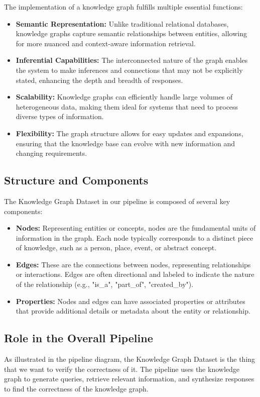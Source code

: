 The implementation of a knowledge graph fulfills multiple essential functions:
\begin{itemize}
    \item \textbf{Semantic Representation:} Unlike traditional relational databases, knowledge graphs capture semantic relationships between entities, allowing for more nuanced and context-aware information retrieval.
    \item \textbf{Inferential Capabilities:} The interconnected nature of the graph enables the system to make inferences and connections that may not be explicitly stated, enhancing the depth and breadth of responses.
    \item \textbf{Scalability:} Knowledge graphs can efficiently handle large volumes of heterogeneous data, making them ideal for systems that need to process diverse types of information.
    \item \textbf{Flexibility:} The graph structure allows for easy updates and expansions, ensuring that the knowledge base can evolve with new information and changing requirements.
\end{itemize}

\subsection{Structure and Components}\label{subsec:structure-and-components}
The Knowledge Graph Dataset in our pipeline is composed of several key components:
\begin{itemize}
    \item \textbf{Nodes:} Representing entities or concepts, nodes are the fundamental units of information in the graph. Each node typically corresponds to a distinct piece of knowledge, such as a person, place, event, or abstract concept.
    \item \textbf{Edges:} These are the connections between nodes, representing relationships or interactions. Edges are often directional and labeled to indicate the nature of the relationship (e.g., "is\_a", "part\_of", "created\_by").
    \item \textbf{Properties:} Nodes and edges can have associated properties or attributes that provide additional details or metadata about the entity or relationship.
\end{itemize}

\subsection{Role in the Overall Pipeline}\label{subsec:role-in-the-overall-pipeline}
As illustrated in the pipeline diagram, the Knowledge Graph Dataset is the thing that we want to verify the correctness of it.
The pipeline uses the knowledge graph to generate queries, retrieve relevant information, and synthesize responses to find the correctness of the knowledge graph.

